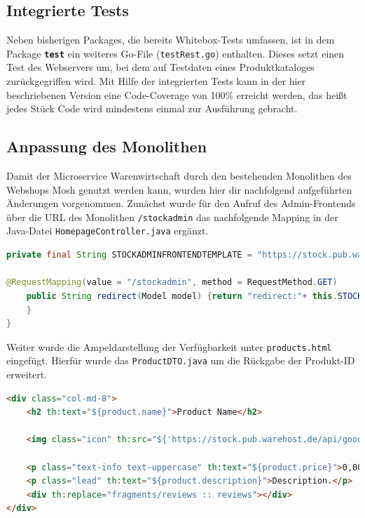 \newpage
\subsection{Integrierte Tests}
\label{subsec: Integrierte Test}
Neben bisherigen Packages, die bereits Whitebox-Tests umfassen, ist in dem Package \textbf{\texttt{test}} ein weiteres Go-File (\texttt{testRest.go}) enthalten. Dieses setzt einen Test des Webservers um, bei dem auf Testdaten eines Produktkataloges zurückgegriffen wird. Mit Hilfe der integrierten Tests kann in der hier beschriebenen Version eine Code-Coverage von 100\% erreicht werden, das heißt jedes Stück Code wird mindestens einmal zur Ausführung gebracht.

\subsection{Anpassung des Monolithen}
\label{subsec: Anpassung des Monolithen}
Damit der Microservice Warenwirtschaft durch den bestehenden Monolithen des Webshops Mosh genutzt werden kann, wurden hier dir nachfolgend aufgeführten Änderungen vorgenommen. Zunächst wurde für den Aufruf des Admin-Frontends über die URL des Monolithen \texttt{/stockadmin} das nachfolgende Mapping in der Java-Datei \texttt{HomepageController.java} ergänzt.

\begin{lstlisting}[caption=Anpassung in HomepageController.java, language=Java]
private final String STOCKADMINFRONTENDTEMPLATE = "https://stock.pub.warehost.de/index.html";

@RequestMapping(value = "/stockadmin", method = RequestMethod.GET)
	public String redirect(Model model) {return "redirect:"+ this.STOCKADMINFRONTENDTEMPLATE;
	}
}
\end{lstlisting}

Weiter wurde die Ampeldarstellung der Verfügbarkeit unter \texttt{products.html} eingefügt. Hierfür wurde das \texttt{ProductDTO.java} um die Rückgabe der Produkt-ID erweitert.

\begin{lstlisting}[caption=Anpassung products.html, language=HTML]
<div class="col-md-8">
	<h2 th:text="${product.name}">Product Name</h2>
	
	<img class="icon" th:src="${'https://stock.pub.warehost.de/api/good/availablity/'+product.id}"/>
	
	<p class="text-info text-uppercase" th:text="${product.price}">0,00 Euro</p>
	<p class="lead" th:text="${product.description}">Description.</p>
	<div th:replace="fragments/reviews :: reviews"></div>
</div>
\end{lstlisting}



\begin{lstlisting}[caption=Anpassung ProductDTO.java, language=Java]
 
 
\end{lstlisting}


